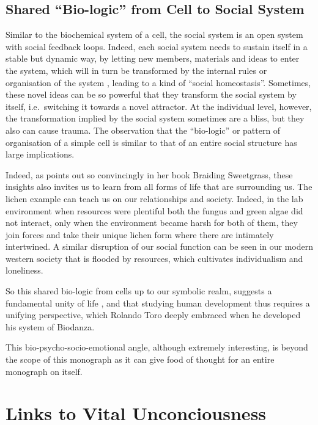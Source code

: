 \documentclass[
  11pt,
]{book}
\begin{document}
\hypertarget{shared-bio-logic-from-cell-to-social-system}{%
\subsection{Shared ``Bio-logic'' from Cell to Social System}\label{shared-bio-logic-from-cell-to-social-system}}

Similar to the biochemical system of a cell, the social system is an open system with social feedback loops. Indeed, each social system needs to sustain itself in a stable but dynamic way, by letting new members, materials and ideas to enter the system, which will in turn be transformed by the internal rules or organisation of the system \citep{capraLuisi2014}, leading to a kind of ``social homeostasis''. Sometimes, these novel ideas can be so powerful that they transform the social system by itself, i.e.~switching it towards a novel attractor. At the individual level, however, the transformation implied by the social system sometimes are a bliss, but they also can cause trauma. The observation that the ``bio-logic'' or pattern of organisation of a simple cell is similar to that of an entire social structure has large implications.

Indeed, as \citet{Kimmerer2013} points out so convincingly in her book Braiding Sweetgrass, these insights also invites us to learn from all forms of life that are surrounding us.
The lichen example can teach us on our relationships and society. Indeed, in the lab environment when resources were plentiful both the fungus and green algae did not interact, only when the environment became harsh for both of them, they join forces and take their unique lichen form where there are intimately intertwined. A similar disruption of our social function can be seen in our modern western society that is flooded by resources, which cultivates individualism and loneliness.

So this shared bio-logic from cells up to our symbolic realm, suggests a fundamental unity of life \citep{capraLuisi2014}, and that studying human development thus requires a unifying perspective, which Rolando Toro deeply embraced when he developed his system of Biodanza.

This bio-psycho-socio-emotional angle, although extremely interesting, is beyond the scope of this monograph as it can give food of thought for an entire monograph on itself.

\hypertarget{links-to-vital-unconciousness}{%
\section{Links to Vital Unconciousness}\label{links-to-vital-unconciousness}}
\end{document}
